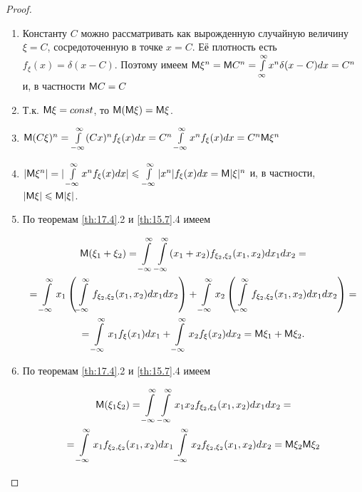 \begin{proof}\-
	\begin{enumerate}
		\item Константу $C$ можно рассматривать как вырожденную случайную величину $\xi = C$, сосредоточенную в точке $x = C$. Её плотность есть $f_{\xi}(x)=\delta(x-C)$. Поэтому имеем $\mathsf{M}\xi^n=\mathsf{M} C^n=\int\limits^{\infty}_{\infty} x^n\delta(x-C)dx=C^n$ и, в частности $\mathsf{M} C=C$

		\item Т.к. $\mathsf{M}\xi=const$, то $\mathsf{M}(\mathsf{M}\xi)=\mathsf{M}\xi$.

		\item $\mathsf{M}(C\xi)^n=\int\limits^{\infty}_{-\infty}(Cx)^nf_{\xi}(x)dx=C^n\int\limits^{\infty}_{-\infty}x^nf_{\xi}(x)dx=C^n\mathsf{M} \xi^n$
		
		\item $|\mathsf{M}\xi^n|=|\int\limits^{\infty}_{-\infty}x^nf_{\xi}(x)dx|\leqslant\int\limits^{\infty}_{-\infty}|x^n|f_{\xi}(x)dx=
		\mathsf{M}|\xi|^n$ и, в частности, $|\mathsf{M}\xi|\leqslant\mathsf{M}|\xi|$.

		\item По теоремам \ref{th:17.4}.2 и \ref{th:15.7}.4 имеем

			\begin{gather*}
				\mathsf{M}(\xi_1+\xi_2)=
				\int\limits^{\infty}_{-\infty}
				\int\limits^{\infty}_{-\infty}
				(x_1+x_2)
				f_{\xi_2,\xi_2}(x_1,x_2)dx_1dx_2
				=\\=
				\int\limits^{\infty}_{-\infty}
				x_1
				\left(\int\limits^{\infty}_{-\infty} 
				f_{\xi_2,\xi_2}(x_1,x_2)dx_1dx_2
				\right)
				+
				\int\limits^{\infty}_{-\infty}
				x_2
				\left(\int\limits^{\infty}_{-\infty} 
				f_{\xi_2,\xi_2}(x_1,x_2)dx_1dx_2
				\right)
				=\\=
				\int\limits^{\infty}_{-\infty}
				x_1 f_{\xi}(x_1)dx_1+
				\int\limits^{\infty}_{-\infty}
				x_2 f_{\xi}(x_2)dx_2=
				\mathsf{M}\xi_1+\mathsf{M}\xi_2.
			\end{gather*}
		\item По теоремам \ref{th:17.4}.2 и \ref{th:15.7}.4 имеем

			\begin{gather*}
				\mathsf{M}(\xi_1\xi_2)=
				\int\limits^{\infty}_{-\infty}\int\limits^{\infty}_{-\infty}
				x_1x_2f_{\xi_2,\xi_2}(x_1,x_2)dx_1dx_2
				=\\=
				\int\limits^{\infty}_{-\infty}
				x_1f_{\xi_2,\xi_2}(x_1,x_2)dx_1 
				\int\limits^{\infty}_{-\infty}
				x_2f_{\xi_2,\xi_2}(x_1,x_2)dx_2=
				\mathsf{M}\xi_2\mathsf{M}\xi_2
			\end{gather*}
	\end{enumerate}
\end{proof}

